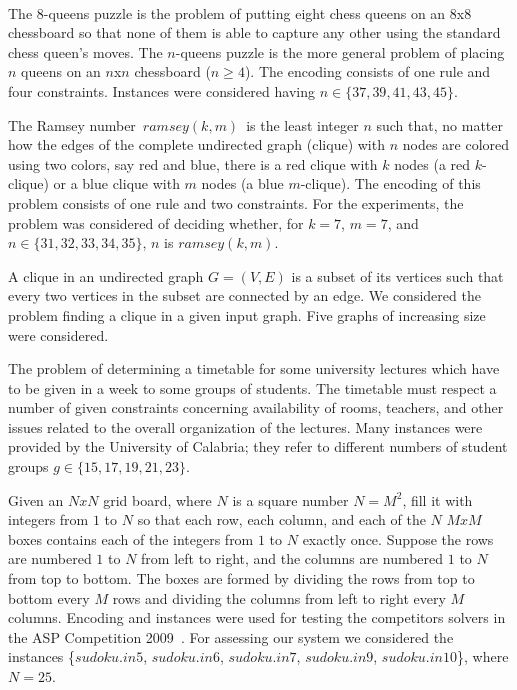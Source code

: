 \documentclass[preprint]{tlp}
\begin{document}
\ \\
The $8$-queens puzzle is the problem of putting eight chess queens
on an $8$x$8$ chessboard so that none of them is able to capture
any other using the standard chess queen's moves.
The $n$-queens puzzle is the more general problem of
placing $n$ queens on an $n$x$n$ chessboard ($n \geq 4$).
The encoding consists of one rule and four constraints.
Instances were considered having $n \in \{37,39,41,43,45\}$.

The Ramsey number\ $ramsey(k,m)$\ is the least integer $n$ such
that, no matter how the edges of the complete undirected graph
(clique) with $n$ nodes are colored using two colors, say red and
blue, there is a red clique with $k$ nodes (a red $k$-clique) or a
blue clique with $m$ nodes (a blue $m$-clique). The encoding of this
problem consists of one rule and two constraints. For the
experiments, the problem was considered of deciding whether, for
$k=7$, $m=7$, and $n\in\{31,32,33,34,35\}$, $n$ is $ramsey(k,m)$.

A clique in an undirected graph $G=(V,E)$ is a subset of its vertices such that every two
vertices in the subset are connected by an edge. We considered the problem
finding a clique in a given input graph.
Five graphs of increasing size were considered.

The problem of determining a timetable for some
university lectures which have to be given in a week to some groups
of students. The timetable must respect a number of given
constraints concerning availability of rooms, teachers, and other
issues related to the overall organization of the lectures. Many
instances were provided by the University of Calabria; they refer
to different numbers of student groups $g \in \{15,17,19,21,23\}$.

Given an $NxN$ grid board, where $N$ is a square number $N=M^2$,
fill it with integers from $1$ to $N$ so that each row, each column,
and each of the $N$ $MxM$ boxes contains each of the integers from $1$ to $N$ exactly once.
Suppose the rows are numbered $1$ to $N$ from left to right, and the columns are
numbered $1$ to $N$ from top to bottom. The boxes are formed by dividing the rows from
top to bottom every $M$ rows and dividing the columns from left to right
every $M$ columns. Encoding and instances were used for testing
the competitors solvers in the ASP Competition 2009~\cite{devebogetr09a}.
For assessing our system we considered the instances
\{$sudoku.in5$, $sudoku.in6$, $sudoku.in7$, $sudoku.in9$, $sudoku.in10$\}, where
$N=25$.
\end{document}
